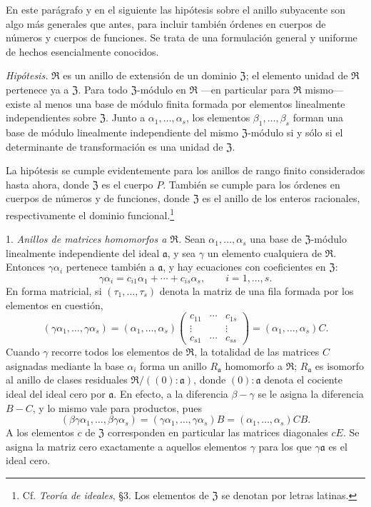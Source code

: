 \documentclass[11pt]{article}
\providecommand{\mR}{\mathfrak{R}}
\providecommand{\mZ}{\mathfrak{Z}}
\providecommand{\ma}{\mathfrak{a}}
\begin{document}
En este parágrafo y en el siguiente las hipótesis sobre el anillo subyacente son algo más generales que antes, para incluir también órdenes en cuerpos de números y cuerpos de funciones. Se trata de una formulación general y uniforme de hechos esencialmente conocidos.

\emph{Hipótesis.} $\mR$ es un anillo de extensión de un dominio $\mZ$; el elemento unidad de $\mR$ pertenece ya a $\mZ$. Para todo $\mZ$-módulo en $\mR$ ---en particular para $\mR$ mismo--- existe al menos una base de módulo finita formada por elementos linealmente independientes sobre $\mZ$. Junto a $\alpha_1,\ldots,\alpha_s$, los elementos $\beta_1,\ldots,\beta_s$ forman una base de módulo linealmente independiente del mismo $\mZ$-módulo si y sólo si el determinante de transformación es una unidad de $\mZ$.

La hipótesis se cumple evidentemente para los anillos de rango finito considerados hasta ahora, donde $\mZ$ es el cuerpo $P$. También se cumple para los órdenes en cuerpos de números y de funciones, donde $\mZ$ es el anillo de los enteros racionales, respectivamente el dominio funcional.\footnote{Cf. \emph{Teoría de ideales}, \S 3. Los elementos de $\mZ$ se denotan por letras latinas.}

1. \emph{Anillos de matrices homomorfos a $\mR$.} Sean $\alpha_1,\ldots,\alpha_s$ una base de $\mZ$-módulo linealmente independiente del ideal $\ma$, y sea $\gamma$ un elemento cualquiera de $\mR$. Entonces $\gamma\alpha_i$ pertenece también a $\ma$, y hay ecuaciones con coeficientes en $\mZ$:
\[
        \gamma\alpha_i=c_{i1}\alpha_1+\cdots+c_{is}\alpha_s,
        \qquad i=1,\ldots,s.
\]
En forma matricial, si $(\tau_1,\ldots,\tau_s)$ denota la matriz de una fila formada por los elementos en cuestión,
\[
 (\gamma\alpha_1,\ldots,\gamma\alpha_s)
 = (\alpha_1,\ldots,\alpha_s)
   \begin{pmatrix}
      c_{11}&\cdots&c_{1s}\\
      \vdots&&\vdots\\
      c_{s1}&\cdots&c_{ss}
   \end{pmatrix}
 = (\alpha_1,\ldots,\alpha_s)C.
\]
Cuando $\gamma$ recorre todos los elementos de $\mR$, la totalidad de las matrices $C$ asignadas mediante la base $\alpha_i$ forma un anillo $R_\ma$ homomorfo a $\mR$; $R_\ma$ es isomorfo al anillo de clases residuales $\mR/((0):\ma)$, donde $(0):\ma$ denota el cociente ideal del ideal cero por $\ma$. En efecto, a la diferencia $\beta-\gamma$ se le asigna la diferencia $B-C$, y lo mismo vale para productos, pues
\[
(\beta\gamma\alpha_1,\ldots,\beta\gamma\alpha_s)
=(\gamma\alpha_1,\ldots,\gamma\alpha_s)B
=(\alpha_1,\ldots,\alpha_s)CB.
\]
A los elementos $c$ de $\mZ$ corresponden en particular las matrices diagonales $cE$. Se asigna la matriz cero exactamente a aquellos elementos $\gamma$ para los que $\gamma\ma$ es el ideal cero.
\end{document}

